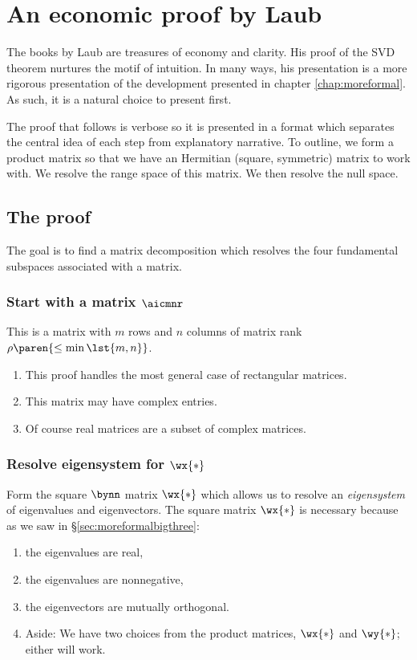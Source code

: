 \section{An economic proof by Laub}

The books by Laub are treasures of economy and clarity. His proof \cite[p. 35]{Laub2005} of the SVD theorem nurtures the motif of intuition. In many ways, his presentation is a more rigorous presentation of the development presented in chapter \eqref{chap:moreformal}. As such, it is a natural choice to present first.

The proof that follows is verbose so it is presented in a format which separates the central idea of each step from explanatory narrative. To outline, we form a product matrix so that we have an Hermitian (square, symmetric) matrix to work with. We resolve the range space of this matrix. We then resolve the null space.

\subsection{The proof}
The goal is to find a matrix decomposition which resolves the four fundamental subspaces associated with a matrix.
\subsubsection{Start with a matrix $\aicmnr$} This is a matrix with $m$ rows and $n$ columns of matrix rank $\rho\paren{\le \min\lst{m,n}}$. 
\begin{enumerate}
\item This proof handles the most general case of rectangular matrices. 
\item This matrix may have complex entries. 
\item Of course real matrices are a subset of complex matrices.
\end{enumerate}
\subsubsection{Resolve eigensystem for $\wx{*}$} Form the square $\bynn$ matrix $\wx{*}$ which allows us to resolve an \emph{eigensystem} of eigenvalues and eigenvectors. The square matrix $\wx{*}$ is necessary because as we saw in \S\eqref{sec:moreformalbigthree}:
\begin{enumerate}
%
\item the eigenvalues are real,
\item the eigenvalues are nonnegative,
\item the eigenvectors are mutually orthogonal.
\item Aside: We have two choices from the product matrices, $\wx{*}$ and $\wy{*}$; either will work.
%
\end{enumerate}
